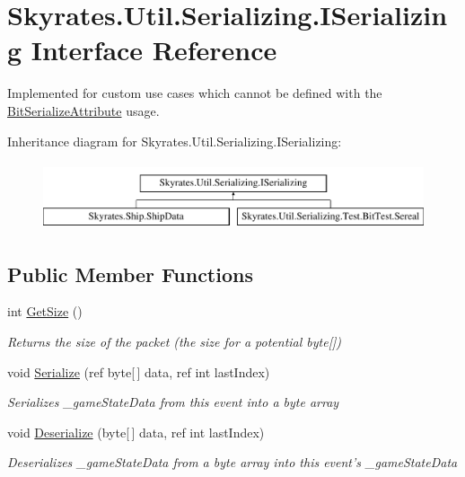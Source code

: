 \hypertarget{interface_skyrates_1_1_util_1_1_serializing_1_1_i_serializing}{\section{Skyrates.\-Util.\-Serializing.\-I\-Serializing Interface Reference}
\label{interface_skyrates_1_1_util_1_1_serializing_1_1_i_serializing}
}


Implemented for custom use cases which cannot be defined with the \hyperlink{class_skyrates_1_1_util_1_1_serializing_1_1_bit_serialize_attribute}{Bit\-Serialize\-Attribute} usage.  


Inheritance diagram for Skyrates.\-Util.\-Serializing.\-I\-Serializing\-:\begin{figure}[H]
\begin{center}
\leavevmode
\includegraphics[height=2.000000cm]{interface_skyrates_1_1_util_1_1_serializing_1_1_i_serializing}
\end{center}
\end{figure}
\subsection*{Public Member Functions}
\begin{DoxyCompactItemize}
\item 
int \hyperlink{interface_skyrates_1_1_util_1_1_serializing_1_1_i_serializing_a0579bf5aa9ef39aab9c9fbe7090f40b7}{Get\-Size} ()
\begin{DoxyCompactList}\small\item\em Returns the size of the packet (the size for a potential byte\mbox{[}\mbox{]}) \end{DoxyCompactList}\item 
void \hyperlink{interface_skyrates_1_1_util_1_1_serializing_1_1_i_serializing_aa2b42f27df9eba772b9a854d37aa3b96}{Serialize} (ref byte\mbox{[}$\,$\mbox{]} data, ref int last\-Index)
\begin{DoxyCompactList}\small\item\em Serializes \-\_\-game\-State\-Data from this event into a byte array \end{DoxyCompactList}\item 
void \hyperlink{interface_skyrates_1_1_util_1_1_serializing_1_1_i_serializing_a48653ea663b59b80bf9ad8661b43ac07}{Deserialize} (byte\mbox{[}$\,$\mbox{]} data, ref int last\-Index)
\begin{DoxyCompactList}\small\item\em Deserializes \-\_\-game\-State\-Data from a byte array into this event's \-\_\-game\-State\-Data \end{DoxyCompactList}\end{DoxyCompactItemize}


